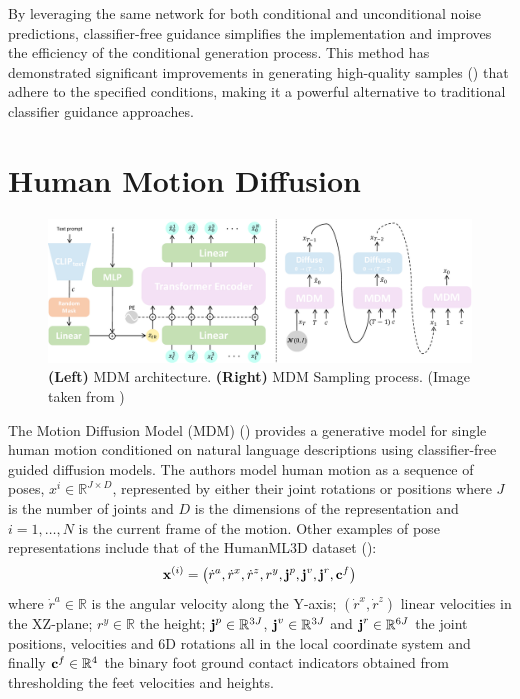 By leveraging the same network for both conditional and unconditional noise predictions, classifier-free guidance simplifies the implementation and improves the efficiency of the conditional generation process. This method has demonstrated significant improvements in generating high-quality samples (\cite{ho2021classifierfree}) that adhere to the specified conditions, making it a powerful alternative to traditional classifier guidance approaches.




\section{Human Motion Diffusion}
\begin{figure}[H]
    \centering
    \includegraphics[width=\linewidth]{figures/mdm_comb.pdf}
    \caption{\textbf{(Left)} MDM architecture. \textbf{(Right)} MDM Sampling process. (Image taken from \cite{tevet2023human})}
    \label{fig:mdm}
\end{figure}
The Motion Diffusion Model (MDM) (\cite{tevet2023human}) provides a generative model for single human motion conditioned on natural language descriptions using classifier-free guided diffusion models. The authors model human motion as a sequence of poses, $x^{i} \in \mathbb{R}^{J \times D}$, represented by either their joint rotations or positions where $J$ is the number of joints and $D$ is the dimensions of the representation and $i = 1, \ldots, N$ is the current frame of the motion. Other examples of pose representations include that of the HumanML3D dataset (\cite{Guo_2022_CVPR}):
\begin{equation}
    \boldsymbol{\mathbf{x}}^{(i)} = \left(\dot{r}^a, \dot{r}^x, \dot{r}^z, r^y, \boldsymbol{\mathbf{j}}^p, \boldsymbol{\mathbf{j}}^v, \boldsymbol{\mathbf{j}}^r, \boldsymbol{\mathbf{c}}^f\right)
    \label{eq:hml3d-repr}
\end{equation}
where $\dot{r}^a \in \mathbb{R}$ is the angular velocity along the Y-axis; $(\dot{r}^x, \dot{r}^z)$ linear velocities in the XZ-plane; $r^y \in \mathbb{R}$ the height; $\boldsymbol{\mathbf{j}}^p \in \mathbb{R}^{3J}$, $\boldsymbol{\mathbf{j}}^v \in \mathbb{R}^{3J}$ and $\boldsymbol{\mathbf{j}}^r \in \mathbb{R}^{6J}$ the joint positions, velocities and 6D rotations all in the local coordinate system and finally $\boldsymbol{\mathbf{c}}^f \in \mathbb{R}^{4}$ the binary foot ground contact indicators obtained from thresholding the feet velocities and heights.


